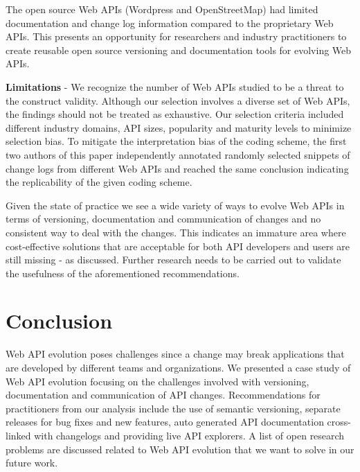 \documentclass[conference]{IEEEtran}
\begin{document}
The open source Web APIs (Wordpress and OpenStreetMap) had limited documentation and change log information compared to the proprietary Web APIs. This presents an opportunity for researchers and industry practitioners to create reusable open source versioning and documentation tools for evolving Web APIs.

\textbf{Limitations} - We recognize the number of Web APIs studied to be a threat to the construct validity. Although our selection involves a diverse set of Web APIs, the findings should not be treated as exhaustive. Our selection criteria included different industry domains, API sizes, popularity and maturity levels to minimize selection bias. To mitigate the interpretation bias of the coding scheme, the first two authors of this paper independently annotated randomly selected snippets of change logs from different Web APIs and reached the same conclusion indicating the replicability of the given coding scheme.

Given the state of practice we see a wide variety of ways to evolve Web APIs in terms of versioning, documentation and communication of changes and no consistent way to deal with the changes. This indicates an immature area where cost-effective solutions that are acceptable for both API developers and users are still missing - as discussed. Further research needs to be carried out to validate the usefulness of the aforementioned recommendations.

\section{Conclusion}
Web API evolution poses challenges since a change may break applications that are developed by different teams and organizations. We presented a case study of Web API evolution focusing on the challenges involved with versioning, documentation and communication of API changes. Recommendations for practitioners from our analysis include the use of semantic versioning, separate releases for bug fixes and new features, auto generated API documentation cross-linked with changelogs and providing live API explorers. A list of open research problems are discussed related to Web API evolution that we want to solve in our future work.



\end{document}
